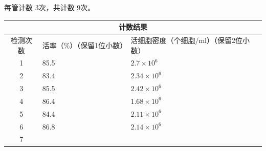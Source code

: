 \documentclass[UTF8,10pt,a4paper,fontset=fandol]{ctexart}
\newcommand{\fieldvalue}[1]{#1}
\newcommand{\handwritten}[1]{#1}
\begin{document}
每管计数
\fieldvalue{\handwritten{3}}次，共计数
\fieldvalue{\handwritten{9}}次。

\begin{center}
\small
\begin{tabularx}{\textwidth}{|c|X|X|}
\hline
\multicolumn{3}{|c|}{计数结果}\\
\hline
检测次数 & 活率（\%）（保留1位小数） & 活细胞密度（个细胞/ml）（保留2位小数）\\
\hline
1 &
\fieldvalue{\handwritten{85.5}} &
\fieldvalue{\handwritten{$2.7\times10^{6}$}}\\
\hline
2 &
\fieldvalue{\handwritten{83.4}} &
\fieldvalue{\handwritten{$2.34\times10^{6}$}}\\
\hline
3 &
\fieldvalue{\handwritten{85.5}} &
\fieldvalue{\handwritten{$2.42\times10^{6}$}}\\
\hline
4 &
\fieldvalue{\handwritten{86.4}} &
\fieldvalue{\handwritten{$1.68\times10^{6}$}}\\
\hline
5 &
\fieldvalue{\handwritten{84.4}} &
\fieldvalue{\handwritten{$2.11\times10^{6}$}}\\
\hline
6 &
\fieldvalue{\handwritten{86.8}} &
\fieldvalue{\handwritten{$2.14\times10^{6}$}}\\
\hline
7 &

\end{tabularx}
\end{center}
\end{document}
